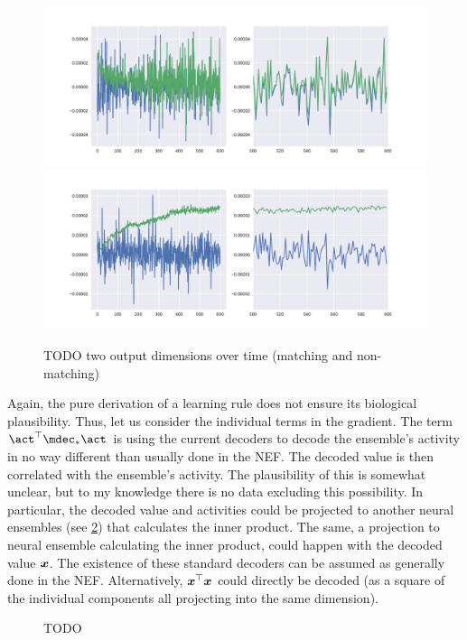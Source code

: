\begin{figure}
    \centering
    \includegraphics[scale=0.6]{figures/aml-matching-decode}
    \includegraphics[scale=0.6]{figures/aml-nonmatching-decode}
    \caption{TODO two output dimensions over time (matching and non-matching)}\label{aml:grad-decode}
\end{figure}

Again, the pure derivation of a learning rule does not ensure its biological plausibility.
Thus, let us consider the individual terms in the gradient.
The term $\vc\act\Tr \mdec_* \vc\act$ is using the current decoders to decode the ensemble's activity in no way different than usually done in the NEF\@.
The decoded value is then correlated with the ensemble's activity.
The plausibility of this is somewhat unclear, but to my knowledge there is no data excluding this possibility.
In particular, the decoded value and activities could be projected to another neural ensembles (see \cref{fig:aml-grad-desc}) that calculates the inner product.
The same, a projection to neural ensemble calculating the inner product, could happen with the decoded value $\bm{x}$.
The existence of these standard decoders can be assumed as generally done in the NEF\@.
Alternatively, $\bm{x}^{\top} \bm{x}$ could directly be decoded (as a square of the individual components all projecting into the same dimension).
\begin{figure}
    \centering
    \caption{TODO}\label{fig:aml-grad-desc}
\end{figure}

